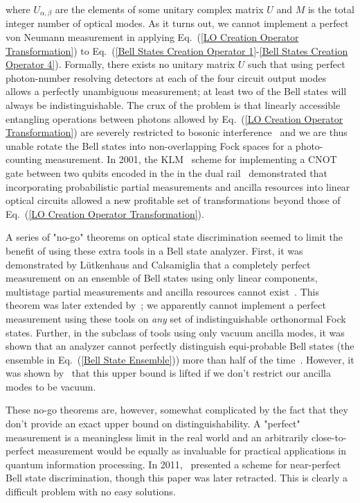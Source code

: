 \documentclass[aps,pra,twocolumn,showpacs,superscriptaddress,floatfix,10pt]{revtex4}
\begin{document}
where $U_{\alpha,\beta}$ are the elements of some unitary complex matrix $U$ and $M$ is the total integer number of optical modes. As it turns out, we cannot implement a perfect von Neumann measurement in applying Eq.~(\ref{LO Creation Operator Transformation}) to Eq.~(\ref{Bell States Creation Operator 1}-\ref{Bell States Creation Operator 4}). Formally, there exists no unitary matrix $U$ such that using perfect photon-number resolving detectors at each of the four circuit output modes allows a perfectly unambiguous measurement; at least two of the Bell states will always be indistinguishable. The crux of the problem is that linearly accessible entangling operations between photons allowed by Eq.~(\ref{LO Creation Operator Transformation}) are severely restricted to bosonic interference~\cite{Review Paper} and we are thus unable rotate the Bell states into non-overlapping Fock spaces for a photo-counting measurement. In 2001, the KLM~\cite{KLM,KLM2} scheme for implementing a CNOT gate between two qubits encoded in the in the dual rail~\cite{Review Paper} demonstrated that incorporating probabilistic partial measurements and ancilla resources into linear optical circuits allowed a new profitable set of transformations beyond those of Eq.~(\ref{LO Creation Operator Transformation}). 

A series of "no-go" theorems on optical state discrimination seemed to limit the benefit of using these extra tools in a Bell state analyzer. First, it was demonstrated by L\"utkenhaus and Calsamiglia that a completely perfect measurement on an ensemble of Bell states using only linear components, multistage partial measurements and ancilla resources cannot exist~\cite{Lutkenhaus}. This theorem was later extended by~\cite{Carollo}; we apparently cannot implement a perfect measurement using these tools on \textit{any} set of indistinguishable orthonormal Fock states. Further, in the subclass of tools using only vacuum ancilla modes, it was shown that an analyzer cannot perfectly distinguish equi-probable Bell states (the ensemble in Eq.~(\ref{Bell State Ensemble})) more than half of the time~\cite{Calsamiglia}. However, it was shown by~\cite{Ewert} that this upper bound is lifted if we don't restrict our ancilla modes to be vacuum.

These no-go theorems are, however, somewhat complicated by the fact that they don't provide an exact upper bound on distinguishability. A "perfect" measurement is a meaningless limit in the real world and an arbitrarily close-to-perfect measurement would be  equally as invaluable for practical applications in quantum information processing. In 2011,~\cite{Pavicic} presented a scheme for near-perfect Bell state discrimination, though this paper was later retracted. This is clearly a difficult problem with no easy solutions.
\end{document}

